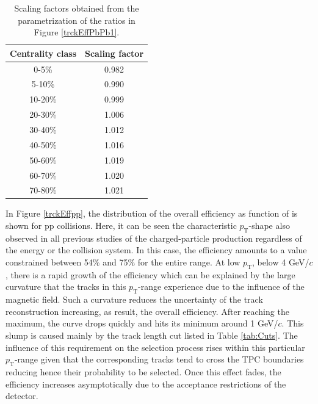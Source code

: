 \documentclass[12pt,a4paper]{report}
\begin{document}
\begin{table}[tb!]
\centering
\renewcommand{\arraystretch}{1.5}
\begin{tabular}{|c|c|}
\toprule
\rowcolor{headerBlue} \textbf{Centrality class} &  \textbf{Scaling factor}\\
\midrule
0-5\%	&	0.982	 \\
5-10\%	&	0.990	 \\
10-20\%	&	0.999	 \\
20-30\%	&	1.006	 \\
30-40\%	&	1.012	 \\
40-50\%	&	1.016	 \\
50-60\%	&	1.019	 \\
60-70\%	&	1.020	 \\
70-80\%	&	1.021	 \\
\bottomrule
\end{tabular}
\caption{Scaling factors obtained from the parametrization of the ratios in Figure \ref{trckEffPbPb1}.}
\label{tab:ScalingFactors}
\end{table} 
In Figure \ref{trckEffpp}, the distribution of the overall efficiency as function of \pt is shown for pp collisions. Here, it can be seen the characteristic $p_\text{T}$-shape also observed in all previous studies of the charged-particle production regardless of the energy or the collision system. In this case, the efficiency amounts to a value constrained between 54\% and 75\% for the entire \pt range. At low $p_\text{T}$, below 4 GeV/$c$, there is a rapid growth of the efficiency which can be explained by the large curvature that the tracks in this $p_\text{T}$-range experience due to the influence of the magnetic field. Such a  curvature reduces the uncertainty of the track reconstruction increasing, as result, the overall efficiency. After reaching the maximum, the curve drops quickly and hits its minimum around 1 GeV/$c$. This slump is caused mainly by the track length cut listed in Table \ref{tab:Cuts}. The influence of this requirement on the selection process rises within this particular $p_\text{T}$-range given that the corresponding tracks tend to cross the TPC boundaries reducing hence their probability to be selected. Once this effect fades, the efficiency increases asymptotically due to the acceptance restrictions of the detector.\\
\end{document}
